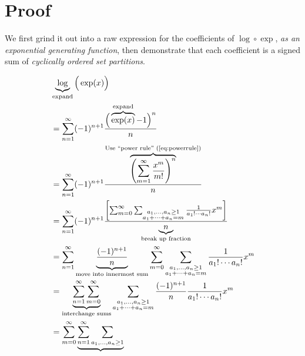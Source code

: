 \documentclass{article}
\begin{document}
\section{Proof}

We first grind it out into a raw expression for the coefficients of $\log \circ \exp$, \textit{as an exponential generating function}, then demonstrate that each coefficient is a signed sum of \textit{cyclically ordered set partitions}.

\begin{align*}
    &
    \underbrace{
        \log
    }_{\text{expand}}
    \Big(\exp(x)\Big)
    \\
    &=
    \sum_{n=1}^\infty
    (-1)^{n+1}
    \frac{
        \Big(
            \overbrace{
                \exp(x)
            }^{\text{expand}}
            -1
        \Big)^n
    }{n}
    \\
    &=
    \sum_{n=1}^\infty
    (-1)^{n+1}
    \frac{
        \overbrace{
            \left(
                \sum_{m=1}^\infty
                \frac{x^m}{m!}
            \right)^n
        }^{\text{Use ``power rule'' (\ref{eq:powerrule})}}
    }{n}
    \\
    &=
    \sum_{n=1}^\infty
    (-1)^{n+1}
    \frac{
        \left[
            \sum_{m=0}^\infty
            \sum_{
                \substack{
                    a_1,\ldots,a_n \geq 1 \\
                    a_1 + \cdots + a_n = m
                }
            }
            \frac{1}{a_1! \cdots a_n!}
            x^m
        \right]
    }{
        \underbrace{n}_{\text{break up fraction}}
    }
    \\
    &=
    \sum_{n=1}^\infty
    \underbrace{
        \frac{(-1)^{n+1}}{n}
    }_{\text{move into innermost sum}}
    \sum_{m=0}^\infty
    \sum_{
        \substack{
            a_1,\ldots,a_n \geq 1 \\
            a_1 + \cdots + a_n = m
        }
    }
    \frac{1}{a_1! \cdots a_n!}
    x^m
    \\
    &=
    \underbrace{
        \sum_{n=1}^\infty
        \sum_{m=0}^\infty
    }_{\text{interchange sums}}
    \sum_{
        \substack{
            a_1,\ldots,a_n \geq 1 \\
            a_1 + \cdots + a_n = m
        }
    }
    \frac{(-1)^{n+1}}{n}
    \frac{1}{a_1! \cdots a_n!}
    x^m
    \\
    &=
    \sum_{m=0}^\infty
    \underbrace{
        \sum_{n=1}^\infty
        \sum_{
            \substack{
                a_1,\ldots,a_n \geq 1 \\
}}}
\end{align*}
\end{document}
